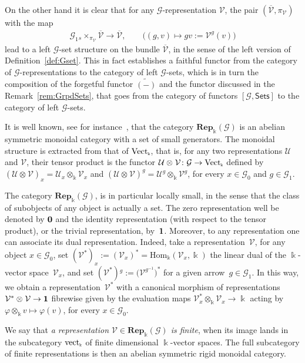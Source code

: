 \documentclass[10pt,a4paper]{amsart}
\numberwithin{equation}{section}
\newcommand{\tensor}[1]{\otimes_{\scriptscriptstyle{#1}}}
\renewcommand{\hom}[3]{\mathrm{Hom}_{\Sscript{#1}}\left(#2, #3\right)}
\newcommand{\td}[1]{\widetilde{#1}}
\newcommand{\bara}[1]{\overline{#1}}
\newcommand{\Rep}[1]{\mathbf{Rep}_{\Sscript{\Bbbk}}(#1)}
\newcommand{\Vect}{{\rm Vect}_{\Sscript{\Bbbk}}}
\newcommand{\vect}{{\rm vect}_{\Sscript{\Bbbk}}}
\newcommand{\Go}{\cG_{\Sscript{0}}}
\newcommand{\Ga}{\cG_{\Sscript{1}}}
\newcommand{\Vx}{\cV_{\Sscript{x}}}
\newcommand{\Vg}{\cV^{\Sscript{g}}}
\newcommand{\cG}{{\mathcal G}}
\newcommand{\cU}{{\mathcal U}}
\newcommand{\cV}{{\mathcal V}}
\newcommand{\Sets}{\mathsf{Sets}}
\newcommand{\Sscript}[1]{\scriptscriptstyle{#1}}
\newcommand{\due}[3]{{}_{{#2 }} {#1}_{{ #3}} }
\begin{document}
\begin{Remark}
On the other hand it is clear that for any $\cG$-representation $\cV$, the pair $(\bara{\cV}, \pi_{\Sscript{\cV}})$ with the map
\begin{gather}\label{Eq:actionV}
\Ga \due \times {\Sscript{s}} { \Sscript{\pi_{\cV}}} \bara{\cV} \longrightarrow \bara{\cV},\qquad \big((g,v) \longmapsto gv:=\Vg(v) \big)
\end{gather}
lead to a left $\cG$-set structure on the bundle $\bara{\cV}$, in the sense of the left version of Definition~\ref{def:Gset}. This in fact establishes a faithful functor from the category of $\cG$-representations to the category of left $\cG$-sets, which is in turn the composition of the forgetful functor $\td{(-)}$ and the functor discussed in the Remark~\ref{rem:GrpdSets}, that goes from the category of functors $[\cG, \Sets]$ to the category of left $\cG$-sets.
\end{Remark}

It is well known, see for instance~\cite{Mitchell:1965}, that the category $\Rep{\cG}$ is an abelian symmetric monoidal category with a set of small generators. The monoidal structure is extracted from that of $\Vect$, that is, for any two representations $\cU$ and $\cV$, their tensor product is the functor $\cU \tensor{}\cV\colon \cG \to \Vect$ defined by $(\cU\tensor{}\cV)_{\Sscript{x}}= \cU_{\Sscript{x}} \tensor{\Bbbk}\cV_{\Sscript{x}}$ and
$(\cU\tensor{}\cV)^{\Sscript{g}}= \cU^{\Sscript{g}}\tensor{\Bbbk} \cV^{\Sscript{g}}$, for every $x \in \Go$ and $g \in \Ga$.

The category $\Rep{\cG}$, is in particular locally small, in the sense that the class of subobjects of any object is actually a set. The zero representation well be denoted by $\bf 0$ and the identity representation (with respect to the tensor product), or the trivial representation, by~$\bf 1$. Moreover, to any representation one can associate its dual representation. Indeed, take a representation~$\cV$, for any object $x \in \Go$, set $(\cV^*)_{\Sscript{x}}:= (\cV_{\Sscript{x}})^*=\hom{\Bbbk}{\cV_{\Sscript{x}}}{\Bbbk}$ the linear dual of the $\Bbbk$-vector space~$\cV_{\Sscript{x}}$, and set $(\cV^*){}^g:= \big(\cV^{\Sscript{g^{-1}}}\big)^*$ for a given arrow~$g \in \Ga$. In this way, we obtain a representation~$\cV^*$ with a canonical morphism of representations $\cV^* \tensor{} \cV \to {\bf 1}$ fibrewise given by the evaluation maps $\cV^*_{\Sscript{x}} \tensor{\Bbbk} \Vx \to \Bbbk$ acting by $\varphi \tensor{\Bbbk}v \mapsto \varphi(v)$, for every $x \in \Go$.

We say that \emph{a representation $\cV \in \Rep{\cG}$ is finite}, when its image lands in the subcategory $\vect$ of finite dimensional $\Bbbk$-vector spaces. The full subcategory of finite representations is then an abelian symmetric rigid monoidal category.
\end{document}
